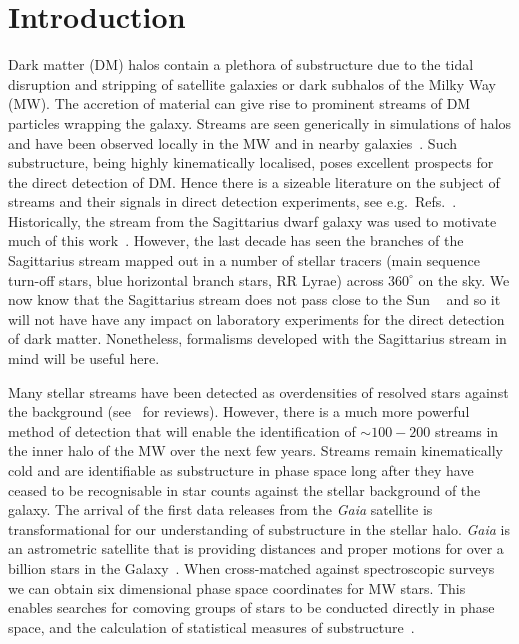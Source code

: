 \documentclass[prd,10pt,twocolumn,showpacs,nofootinbib,aps,superscriptaddress,preprintnumbers]{revtex4-1}
\begin{document}
\section{Introduction}

Dark matter (DM) halos contain a plethora of substructure due to the
tidal disruption and stripping of satellite galaxies or dark subhalos
of the Milky Way (MW). The accretion of material can give rise to
prominent streams of DM particles wrapping the
galaxy. Streams are seen generically in simulations of halos and have
been observed locally in the MW and in nearby
galaxies~\cite{Belokurov:2006,Myeong:2018,Shipp:2018yce}. Such
substructure, being highly kinematically localised, poses excellent
prospects for the direct detection of DM. Hence there is a
sizeable literature on the subject of streams and their signals in
direct detection experiments, see
e.g.\ Refs.~\cite{Lee:2012pf,O'Hare:2014oxa,Savage:2006qr,Foster:2017hbq,OHare:2017yze,Kavanagh:2016xfi}. Historically,
the stream from the Sagittarius dwarf galaxy was used to motivate much
of this
work~\cite{Newberg:2003cu,Yanny:2003zu,Majewski:2003ux,Luque:2016nsz,Purcell:2012sh,Purcell:2011nf}. However,
the last decade has seen the branches of the Sagittarius stream mapped
out in a number of stellar tracers (main sequence turn-off stars, blue
horizontal branch stars, RR Lyrae) across $360^\circ$ on the sky. We
now know that the Sagittarius stream does not pass close to the Sun
~\cite{Koposov:2012, Belokurov:2014} and so it will not have have any
impact on laboratory experiments for the direct detection of dark
matter.  Nonetheless, formalisms developed with the Sagittarius stream
in mind will be useful here.

Many stellar streams have been detected as overdensities of resolved
stars against the background (see~\citet{Newberg:2016} for
reviews). However, there is a much more powerful method of detection
that will enable the identification of $\sim 100-200$ streams in the
inner halo of the MW over the next few years.  Streams remain
kinematically cold and are identifiable as substructure in phase space
long after they have ceased to be recognisable in star counts against
the stellar background of the galaxy. The arrival of the first data
releases from the {\it Gaia} satellite is transformational for our
understanding of substructure in the stellar halo. {\it Gaia} is an
astrometric satellite that is providing distances and proper motions
for over a billion stars in the Galaxy~\citep{Gaia:2016}. When
cross-matched against spectroscopic surveys we can obtain six
dimensional phase space coordinates for MW stars. This enables
searches for comoving groups of stars to be conducted directly in
phase space, and the calculation of statistical measures of
substructure~\citep{Helmi:2017,Myeong:2017,Lancaster:2018}.
\end{document}
